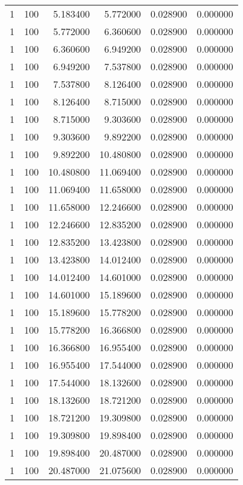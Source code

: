 \begin{longtable}{rrrrrr}
1 & 100 & 5.183400 & 5.772000 & 0.028900 & 0.000000 \\
1 & 100 & 5.772000 & 6.360600 & 0.028900 & 0.000000 \\
1 & 100 & 6.360600 & 6.949200 & 0.028900 & 0.000000 \\
1 & 100 & 6.949200 & 7.537800 & 0.028900 & 0.000000 \\
1 & 100 & 7.537800 & 8.126400 & 0.028900 & 0.000000 \\
1 & 100 & 8.126400 & 8.715000 & 0.028900 & 0.000000 \\
1 & 100 & 8.715000 & 9.303600 & 0.028900 & 0.000000 \\
1 & 100 & 9.303600 & 9.892200 & 0.028900 & 0.000000 \\
1 & 100 & 9.892200 & 10.480800 & 0.028900 & 0.000000 \\
1 & 100 & 10.480800 & 11.069400 & 0.028900 & 0.000000 \\
1 & 100 & 11.069400 & 11.658000 & 0.028900 & 0.000000 \\
1 & 100 & 11.658000 & 12.246600 & 0.028900 & 0.000000 \\
1 & 100 & 12.246600 & 12.835200 & 0.028900 & 0.000000 \\
1 & 100 & 12.835200 & 13.423800 & 0.028900 & 0.000000 \\
1 & 100 & 13.423800 & 14.012400 & 0.028900 & 0.000000 \\
1 & 100 & 14.012400 & 14.601000 & 0.028900 & 0.000000 \\
1 & 100 & 14.601000 & 15.189600 & 0.028900 & 0.000000 \\
1 & 100 & 15.189600 & 15.778200 & 0.028900 & 0.000000 \\
1 & 100 & 15.778200 & 16.366800 & 0.028900 & 0.000000 \\
1 & 100 & 16.366800 & 16.955400 & 0.028900 & 0.000000 \\
1 & 100 & 16.955400 & 17.544000 & 0.028900 & 0.000000 \\
1 & 100 & 17.544000 & 18.132600 & 0.028900 & 0.000000 \\
1 & 100 & 18.132600 & 18.721200 & 0.028900 & 0.000000 \\
1 & 100 & 18.721200 & 19.309800 & 0.028900 & 0.000000 \\
1 & 100 & 19.309800 & 19.898400 & 0.028900 & 0.000000 \\
1 & 100 & 19.898400 & 20.487000 & 0.028900 & 0.000000 \\
1 & 100 & 20.487000 & 21.075600 & 0.028900 & 0.000000 \\

\end{longtable}
